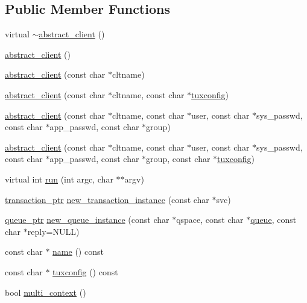\subsection*{Public Member Functions}
\begin{DoxyCompactItemize}
\item 
virtual \hyperlink{classatmi_1_1abstract__client_a789a662f195c11cd9d9b6d091caa0874}{$\sim$abstract\+\_\+client} ()
\item 
\hyperlink{classatmi_1_1abstract__client_a10a6aa2b44cb98ceab7d4e637757437e}{abstract\+\_\+client} ()
\item 
\hyperlink{classatmi_1_1abstract__client_a1949a3885943d5316cd569e672adacd8}{abstract\+\_\+client} (const char $\ast$cltname)
\item 
\hyperlink{classatmi_1_1abstract__client_ac3080bb9b9b153c40b8f3ffacd109f53}{abstract\+\_\+client} (const char $\ast$cltname, const char $\ast$\hyperlink{classatmi_1_1abstract__client_af2a6efcd7a45c09251cb129d04d7aa85}{tuxconfig})
\item 
\hyperlink{classatmi_1_1abstract__client_a03f32cbbc3eed531f5f4131069269391}{abstract\+\_\+client} (const char $\ast$cltname, const char $\ast$user, const char $\ast$sys\+\_\+passwd, const char $\ast$app\+\_\+passwd, const char $\ast$group)
\item 
\hyperlink{classatmi_1_1abstract__client_acf4d0eb4fa3005afbaae8fef9a56d042}{abstract\+\_\+client} (const char $\ast$cltname, const char $\ast$user, const char $\ast$sys\+\_\+passwd, const char $\ast$app\+\_\+passwd, const char $\ast$group, const char $\ast$\hyperlink{classatmi_1_1abstract__client_af2a6efcd7a45c09251cb129d04d7aa85}{tuxconfig})
\item 
virtual int \hyperlink{classatmi_1_1abstract__client_a090bac30edb1055da2a0c980167bfe19}{run} (int argc, char $\ast$$\ast$argv)
\item 
\hyperlink{group__atmi_gab8e359f2305eaf285b0b0745d3b41997}{transaction\+\_\+ptr} \hyperlink{classatmi_1_1abstract__client_a9449f2df2136afd5b253389418265c87}{new\+\_\+transaction\+\_\+instance} (const char $\ast$svc)
\item 
\hyperlink{group__atmi_ga7cfd5961e0e05b148f12be311177a1a8}{queue\+\_\+ptr} \hyperlink{classatmi_1_1abstract__client_a7337c966369376497d9c1f94ec12c5ae}{new\+\_\+queue\+\_\+instance} (const char $\ast$qspace, const char $\ast$\hyperlink{classatmi_1_1queue}{queue}, const char $\ast$reply=N\+U\+L\+L)
\item 
const char $\ast$ \hyperlink{classatmi_1_1abstract__client_a2f50ed746c5bab5e01ef0677296e10e3}{name} () const 
\item 
const char $\ast$ \hyperlink{classatmi_1_1abstract__client_af2a6efcd7a45c09251cb129d04d7aa85}{tuxconfig} () const 
\item 
bool \hyperlink{classatmi_1_1abstract__client_a026c8cff81a66afdcfa3bf977417738a}{multi\+\_\+context} ()
\end{DoxyCompactItemize}
